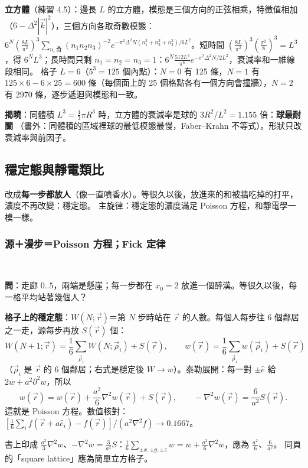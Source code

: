 \textbf{立方體}（練習 4.5）：邊長 $L$ 的立方體，模態是三個方向的正弦相乘，特徵值相加（$6-\Delta^2|\vec k|^2$），三個方向各取奇數模態：
$6^N(\frac{8L}{\pi^2})^3\sum_{n_i\,\text{奇}}(n_1n_2n_3)^{-2}e^{-\pi^2\Delta^2N(n_1^2+n_2^2+n_3^2)/6L^2}$。短時間 $(\frac{8L}{\pi^2})^3(\frac{\pi^2}8)^3=L^3$，得 $6^NL^3$；長時間只剩 $n_1=n_2=n_3=1$：$6^N\frac{512L^3}{\pi^6}e^{-\pi^2\Delta^2N/2L^2}$，衰減率和一維線段相同。
格子 $L=6$（$5^3=125$ 個內點）：$N=0$ 有 125 條，$N=1$ 有 $125\times6-6\times25=600$ 條（每個面上的 25 個格點各有一個方向會撞牆），$N=2$ 有 2970 條，逐步遞迴與模態和一致。
\begin{table}[H]
\centering
\FourTabShapes
\caption{三種吸收區域的比較。前因子 $\div$ 體積：線段 0.811、立方體 0.533、球 0.608。同體積時立方體與球的衰減率之比是 $3(3/4\pi)^{2/3}=1.155$}\label{four-tab-shapes}
\end{table}
\textbf{揭曉}：同體積 $L^3=\frac43\pi R^3$ 時，立方體的衰減率是球的 $3R^2/L^2=1.155$ 倍：\textbf{球最耐關}
（書外：同體積的區域裡球的最低模態最慢，Faber--Krahn 不等式）。形狀只改衰減率與前因子。

\subsection{穩定態與靜電類比}
\quad 改成\textbf{每一步都放人}（像一直噴香水）。等很久以後，放進來的和被牆吃掉的打平，濃度不再改變：穩定態。
主旋律：穩定態的濃度滿足 Poisson 方程，和靜電學一模一樣。

\subsubsection{源＋漫步＝Poisson 方程；Fick 定律}
\ 

\textbf{問}：走廊 $0..5$，兩端是懸崖；每一步都在 $x_0=2$ 放進一個醉漢。等很久以後，每一格平均站著幾個人？

\textbf{格子上的穩定態}：$W(N;\vec r)$＝第 $N$ 步時站在 $\vec r$ 的人數。每個人每步往 6 個鄰居之一走，源每步再放 $S(\vec r)$ 個：
\[W(N+1;\vec r)=\frac16\sum_{\vec\rho_i}W(N;\vec\rho_i)+S(\vec r),\qquad w(\vec r)=\frac16\sum_{\vec\rho_i}w(\vec\rho_i)+S(\vec r)\tag{4.38, 4.39}\]
（$\vec\rho_i$ 是 $\vec r$ 的 6 個鄰居；右式是穩定後 $W\to w$）。泰勒展開：每一對 $\pm\hat e$ 給 $2w+a^2\partial^2w$，所以
\[w(\vec r)=w(\vec r)+\frac{a^2}{6}\nabla^2w(\vec r)+S(\vec r),\qquad -\nabla^2w(\vec r)=\frac{6}{a^2}S(\vec r).\tag{4.40, 4.41}\]
這就是 Poisson 方程。數值核對：$[\frac16\sum_if(\vec r+a\hat e_i)-f(\vec r)]/(a^2\nabla^2f)\to0.1667$。
\begin{errbox}[p.~83，(4.40)(4.41)]
書上印成 $\frac{a^2}{3}\nabla^2w$、$-\nabla^2w=\frac{3}{a^2}S$：$\frac16\sum_{\pm x,\pm y,\pm z}w=w+\frac{a^2}{6}\nabla^2w$，應為 $\frac{a^2}{6}$、$\frac{6}{a^2}$。
同頁的「square lattice」應為簡單立方格子。
\end{errbox}

